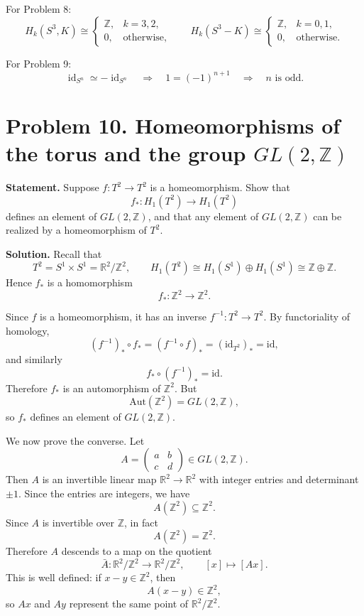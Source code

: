 \documentclass[12pt,a4paper]{article}
\theoremstyle{notespace}
\begin{document}
For Problem 8:
\[
H_k(S^3,K)\cong
\begin{cases}
	\mathbb Z, & k=3,2,\\
	0, & \text{otherwise},
\end{cases}
\qquad
H_k(S^3-K)\cong
\begin{cases}
	\mathbb Z, & k=0,1,\\
	0, & \text{otherwise}.
\end{cases}
\]

For Problem 9:
\[
\operatorname{id}_{S^n}\simeq -\operatorname{id}_{S^n}
\quad\Longrightarrow\quad
1=(-1)^{n+1}
\quad\Longrightarrow\quad
n \text{ is odd.}
\]

\section{Problem 10. Homeomorphisms of the torus and the group \(GL(2,\mathbb Z)\)}

\textbf{Statement.}
Suppose \(f:T^2\to T^2\) is a homeomorphism. Show that
\[
f_*:H_1(T^2)\to H_1(T^2)
\]
defines an element of \(GL(2,\mathbb Z)\), and that any element of \(GL(2,\mathbb Z)\) can be realized by a homeomorphism of \(T^2\).

\medskip

\textbf{Solution.}
Recall that
\[
T^2=S^1\times S^1=\mathbb R^2/\mathbb Z^2,
\qquad
H_1(T^2)\cong H_1(S^1)\oplus H_1(S^1)\cong \mathbb Z\oplus \mathbb Z.
\]
Hence \(f_*\) is a homomorphism
\[
f_*:\mathbb Z^2\to \mathbb Z^2.
\]

Since \(f\) is a homeomorphism, it has an inverse \(f^{-1}:T^2\to T^2\). By functoriality of homology,
\[
(f^{-1})_*\circ f_*=(f^{-1}\circ f)_*=(\mathrm{id}_{T^2})_*=\mathrm{id},
\]
and similarly
\[
f_*\circ (f^{-1})_*=\mathrm{id}.
\]
Therefore \(f_*\) is an automorphism of \(\mathbb Z^2\). But
\[
\mathrm{Aut}(\mathbb Z^2)=GL(2,\mathbb Z),
\]
so \(f_*\) defines an element of \(GL(2,\mathbb Z)\).

We now prove the converse. Let
\[
A=\begin{pmatrix}a&b\\ c&d\end{pmatrix}\in GL(2,\mathbb Z).
\]
Then \(A\) is an invertible linear map \(\mathbb R^2\to \mathbb R^2\) with integer entries and determinant \(\pm 1\). Since the entries are integers, we have
\[
A(\mathbb Z^2)\subseteq \mathbb Z^2.
\]
Since \(A\) is invertible over \(\mathbb Z\), in fact
\[
A(\mathbb Z^2)=\mathbb Z^2.
\]
Therefore \(A\) descends to a map on the quotient
\[
\bar A:\mathbb R^2/\mathbb Z^2\to \mathbb R^2/\mathbb Z^2,
\qquad
[x]\mapsto [Ax].
\]
This is well defined: if \(x-y\in \mathbb Z^2\), then
\[
A(x-y)\in \mathbb Z^2,
\]
so \(Ax\) and \(Ay\) represent the same point of \(\mathbb R^2/\mathbb Z^2\).
\end{document}
